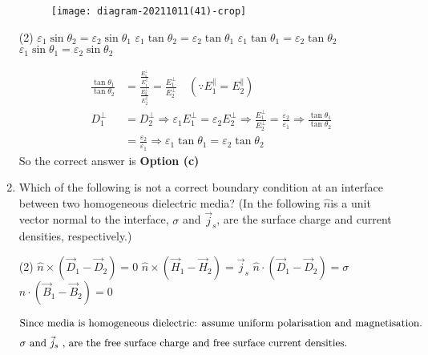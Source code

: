 \begin{enumerate}
	\begin{figure}[H]
		\centering
		\texttt{[image: diagram-20211011(41)-crop]}
	\end{figure}
	\begin{tasks}(2)
		\task[\textbf{a.}] $\varepsilon_{1} \sin \theta_{2}=\varepsilon_{2} \sin \theta_{1}$
		\task[\textbf{b.}] $\varepsilon_{1} \tan \theta_{2}=\varepsilon_{2} \tan \theta_{1}$
		\task[\textbf{c.}] $\varepsilon_{1} \tan \theta_{1}=\varepsilon_{2} \tan \theta_{2}$
		\task[\textbf{d.}] $\varepsilon_{1} \sin \theta_{1}=\varepsilon_{2} \sin \theta_{2}$
	\end{tasks}
\begin{answer}
	\begin{align*}
	\frac{\tan \theta_{1}}{\tan \theta_{2}}&=\frac{\frac{E_{1}^{\perp}}{E_{1}^{\|}}}{\frac{E_{2}^{\perp}}{E_{2}^{\|}}}=\frac{E_{1}^{\perp}}{E_{2}^{\perp}} \quad\left(\because E_{1}^{\|}=E_{2}^{\|}\right)\\
	D_{1}^{\perp}&=D_{2}^{\perp} \Rightarrow \varepsilon_{1} E_{1}^{\perp}=\varepsilon_{2} E_{2}^{\perp} \Rightarrow \frac{E_{1}^{\perp}}{E_{2}^{\perp}}=\frac{\varepsilon_{2}}{\varepsilon_{1}} \Rightarrow \frac{\tan \theta_{1}}{\tan \theta_{2}}\\&=\frac{\varepsilon_{2}}{\varepsilon_{1}} \Rightarrow \varepsilon_{1} \tan \theta_{1}=\varepsilon_{2} \tan \theta_{2}
	\end{align*}
	So the correct answer is \textbf{Option (c)}
\end{answer}
	\item Which of the following is not a correct boundary condition at an interface between two homogeneous dielectric media? (In the following $\hat{n}$is a unit vector normal to the  interface, $\sigma$ and $\vec{j}_s$, are the surface charge and current densities, respectively.)
	{}
	\begin{tasks}(2)
		\task[\textbf{a.}] $\hat{n} \times\left(\vec{D}_{1}-\vec{D}_{2}\right)=0$
		\task[\textbf{b.}] $\hat{n} \times\left(\vec{H}_{1}-\vec{H}_{2}\right)=\vec{j}_{s}$
		\task[\textbf{c.}] $\hat{n} \cdot\left(\vec{D}_{1}-\vec{D}_{2}\right)=\sigma$
		\task[\textbf{d.}] $\hat{n} \cdot\left(\vec{B}_{1}-\vec{B}_{2}\right)=0$
	\end{tasks}
\begin{answer}
	\begin{align*}
	\intertext{Since media is homogeneous dielectric:
		assume uniform polarisation and
		magnetisation.}
	\intertext{$\sigma$ and $\vec{j }_s$ , are the free surface charge and free surface current densities.}

\end{align*}
\end{answer}
\end{enumerate}
